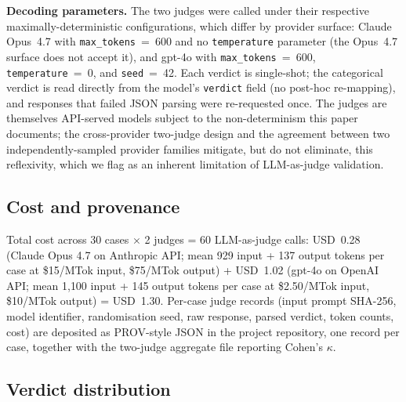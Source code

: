 \documentclass[11pt]{article}
\begin{document}
\textbf{Decoding parameters.} The two judges were called under their respective maximally-deterministic configurations, which differ by provider surface: Claude Opus~4.7 with \texttt{max\_tokens}~=~600 and no \texttt{temperature} parameter (the Opus~4.7 surface does not accept it), and gpt-4o with \texttt{max\_tokens}~=~600, \texttt{temperature}~=~0, and \texttt{seed}~=~42. Each verdict is single-shot; the categorical verdict is read directly from the model's \texttt{verdict} field (no post-hoc re-mapping), and responses that failed JSON parsing were re-requested once. The judges are themselves API-served models subject to the non-determinism this paper documents; the cross-provider two-judge design and the agreement between two independently-sampled provider families mitigate, but do not eliminate, this reflexivity, which we flag as an inherent limitation of LLM-as-judge validation.

\subsection{Cost and provenance}

Total cost across 30 cases $\times$ 2 judges = 60 LLM-as-judge calls: USD~0.28 (Claude Opus 4.7 on Anthropic API; mean 929 input + 137 output tokens per case at \$15/MTok input, \$75/MTok output) + USD~1.02 (gpt-4o on OpenAI API; mean 1{,}100 input + 145 output tokens per case at \$2.50/MTok input, \$10/MTok output) = USD~1.30. Per-case judge records (input prompt SHA-256, model identifier, randomisation seed, raw response, parsed verdict, token counts, cost) are deposited as PROV-style JSON in the project repository, one record per case, together with the two-judge aggregate file reporting Cohen's $\kappa$.

\subsection{Verdict distribution}
\end{document}
